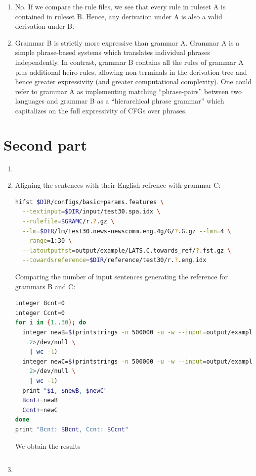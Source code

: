 \documentclass[a4paper,oneside,reqno]{amsart}
\begin{document}
\begin{enumerate}[label=\arabic*.]
  \item No. If we compare the rule files, we see that every rule in ruleset A is
    contained in ruleset B. Hence, any derivation under A is also a valid derivation under
    B.

  \item Grammar B is strictly more expressive than grammar A. Grammar A is a simple phrase-based
    systems which translates individual phrases independently. In contrast, grammar B contains all
    the rules of grammar A plus additional heiro rules, allowing non-terminals in the derivation
    tree and hence greater expressivity (and greater computational complexity). One could
    refer to grammar A as implementing matching ``phrase-pairs'' between two languages
    and grammar B as a ``hierarchical phrase grammar'' which capitalizes on the full
    expressivity of CFGs over phrases.
\end{enumerate}

\section{Second part}

\begin{enumerate}[label=\arabic*.]
  \item

  \item
    Aligning the sentences with their English refrence with grammar C:

    \begin{lstlisting}[language=bash]
hifst $DIR/configs/basic+params.features \
  --textinput=$DIR/input/test30.spa.idx \
  --rulefile=$GRAMC/r.?.gz \
  --lm=$DIR/lm/test30.news-newscomm.eng.4g/G/?.G.gz --lmn=4 \
  --range=1:30 \
  --latoutputfst=output/example/LATS.C.towards_ref/?.fst.gz \
  --towardsreference=$DIR/reference/test30/r.?.eng.idx
    \end{lstlisting}

    Comparing the number of input sentences generating the reference
    for grammars B and C:
    \begin{lstlisting}[language=bash]
integer Bcnt=0
integer Ccnt=0
for i in {1..30}; do
  integer newB=$(printstrings -n 500000 -u -w --input=output/example/LATS.B.towards_ref/$i.fst.gz \
    2>/dev/null \
    | wc -l)
  integer newC=$(printstrings -n 500000 -u -w --input=output/example/LATS.C.towards_ref/$i.fst.gz \
    2>/dev/null \
    | wc -l)
  print "$i, $newB, $newC"
  Bcnt+=newB
  Ccnt+=newC
done
print "Bcnt: $Bcnt, Ccnt: $Ccnt"
    \end{lstlisting}

    We obtain the results %
    \begin{verbatim}
    \end{verbatim}

  \item
\end{enumerate}

%
%


\end{document}
